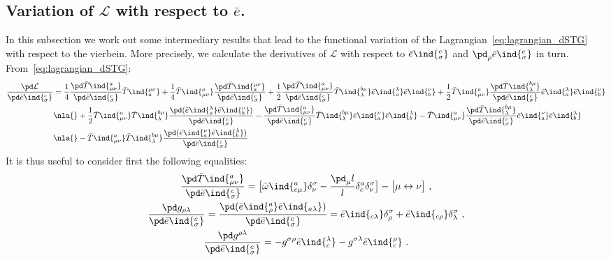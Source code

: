 \documentclass[11pt]{article}
\begin{document}
\subsection{Variation of $\mathcal{L}$ with respect to 
	$\bar{e}$.}
\label{app:field_eqs}

In this subsection we work out some intermediary results that 
lead to the functional variation of the 
Lagrangian~\eqref{eq:lagrangian_dSTG} with respect to the 
vierbein. More precisely, we calculate the derivatives of 
$\mathcal{L}$ with respect to $\bar{e}\ind{^c_\sigma}$ and 
$\pd_\rho \bar{e}\ind{^c_\sigma}$ in turn.  
From~\eqref{eq:lagrangian_dSTG}:
\begin{displaymath}
\begin{split}
	\frac{\pd \mathcal{L}}{\pd \bar{e}\ind{^c_\sigma}}
	&= \frac{1}{4} \frac{\pd \bar{T}\ind{^a_{\mu\nu}}}{\pd 
		\bar{e}\ind{^c_\sigma}} \bar{T}\ind{_a^{\mu\nu}}
	+ \frac{1}{4} \bar{T}\ind{^a_{\mu\nu}} \frac{\pd 
		\bar{T}\ind{_a^{\mu\nu}}}{\pd \bar{e}\ind{^c_\sigma}}
	+ \frac{1}{2} \frac{\pd \bar{T}\ind{^a_{\mu\nu}}}{\pd 
		\bar{e}\ind{^c_\sigma}} \bar{T}\ind{^{b\mu}_\lambda} 
	\bar{e}\ind{_a^\lambda} \bar{e}\ind{_b^\nu}
	+ \frac{1}{2} \bar{T}\ind{^a_{\mu\nu}} \frac{\pd 
		\bar{T}\ind{^{b\mu}_\lambda}}{\pd \bar{e}\ind{^c_\sigma}} 
	\bar{e}\ind{_a^\lambda} \bar{e}\ind{_b^\nu}
	\\
	&\nla{} + \frac{1}{2} \bar{T}\ind{^a_{\mu\nu}} 
	\bar{T}\ind{^{b\mu}_\lambda} \frac{\pd( 
		\bar{e}\ind{_a^\lambda} \bar{e}\ind{_b^\nu})}{\pd 
		\bar{e}\ind{^c_\sigma}}
	- \frac{\pd \bar{T}\ind{^a_{\mu\nu}}}{\pd 
		\bar{e}\ind{^c_\sigma}} \bar{T}\ind{^{b\mu}_\lambda} 
	\bar{e}\ind{_a^\nu} \bar{e}\ind{_b^\lambda}
	- \bar{T}\ind{^a_{\mu\nu}} \frac{\pd 
		\bar{T}\ind{^{b\mu}_\lambda}}{\pd \bar{e}\ind{^c_\sigma}} 
	\bar{e}\ind{_a^\nu} \bar{e}\ind{_b^\lambda}
	\\
	&\nla{} - \bar{T}\ind{^a_{\mu\nu}} 
	\bar{T}\ind{^{b\mu}_\lambda} \frac{\pd( \bar{e}\ind{_a^\nu} 
		\bar{e}\ind{_b^\lambda})}{\pd \bar{e}\ind{^c_\sigma}}
\end{split}
\end{displaymath}
It is thus useful to consider first the following equalities:
\begin{gather*}
	\frac{\pd \bar{T}\ind{^a_{\mu\nu}}}{\pd \bar{e}\ind{^c_\sigma}}
	= \big[ \bar{\omega}\ind{^a_{c\mu}} \delta^\sigma_\nu - 
	\frac{\pd_\mu l}{l} \delta^a_c \delta^\sigma_\nu \big] - \big[ 
	\mu \leftrightarrow \nu \big]~,
	\\
	\frac{\pd g_{\rho\lambda}}{\pd \bar{e}\ind{^c_\sigma}} = 
	\frac{\pd (\bar{e}\ind{^a_\rho} \bar{e}\ind{_{a\lambda}})}{\pd 
		\bar{e}\ind{^c_\sigma}} = \bar{e}\ind{_{c\lambda}} 
	\delta^\sigma_\rho + \bar{e}\ind{_{c\rho}} 
	\delta^\sigma_\lambda~,
	\\
	\frac{\pd g^{\rho\lambda}}{\pd \bar{e}\ind{^c_\sigma}} =
	- g^{\sigma\rho} \bar{e}\ind{_c^\lambda} - g^{\sigma\lambda} 
	\bar{e}\ind{_c^\rho}~.
\end{gather*}
\end{document}
